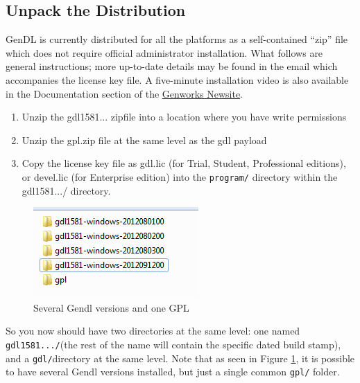 \documentclass [11pt]{book}
\begin{document}
\subsection{Unpack the Distribution}

\label{subsec:unpackthedistribution}

GenDL is currently distributed for all the platforms as a
self-contained ``zip'' file which does not require official
administrator installation.  What follows are general instructions; more up-to-date details
may be found in the email which accompanies the license key file. A five-minute installation video
is also available in the Documentation section of the \href{http://genworks.com/newsite}{Genworks Newsite}.

\begin{enumerate}

\item Unzip the gdl1581... zipfile into a location where you have write permissions

\item Unzip the gpl.zip file at the same level as the gdl payload

\item Copy the license key file as gdl.lic (for Trial,
	 Student, Professional editions), or devel.lic (for Enterprise edition) into the \texttt{program/} directory within the gdl1581.../ directory.

\end{enumerate}


\begin{figure}
\begin{center}
\includegraphics{../images/gendl-installation.png}
\end{center}

\caption{Several Gendl versions and one GPL }

\label{fig:gendl-installation}

\end{figure}
So you now should have two directories at the same level: one named \texttt{gdl1581.../}(the rest of the name will contain the specific dated build stamp), and a \texttt{gdl/}directory at the same level. Note that as seen in Figure 
\ref{fig:gendl-installation}, it is possible to have several Gendl versions installed, but just a single common \texttt{gpl/} folder.
\end{document}

